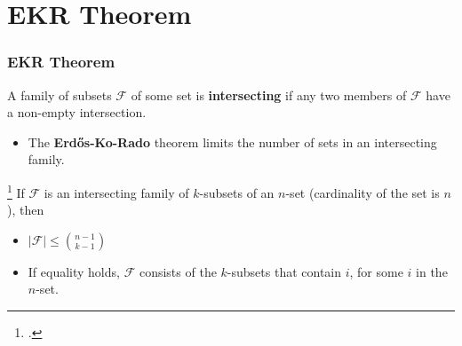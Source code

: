 \documentclass[10pt,]{beamer}
\theoremstyle{conjectureStyle}
\theoremstyle{notationStyle}
\begin{document}
\section{EKR Theorem}
\begin{frame}\frametitle{EKR Theorem}
    \begin{definition}
        A family of subsets $\mathcal{F}$ of some set is \textbf{intersecting} if any two members of $\mathcal{F}$ have a non-empty intersection.
    \end{definition}
    \begin{itemize}
        \item The \textbf{Erd\H{o}s-Ko-Rado} theorem limits the number of sets in an intersecting family.
    \end{itemize}
    \begin{theorem}
        \footcite{Erds1961INTERSECTIONTF} If $\mathcal{F}$ is an intersecting family of $k$-subsets of an $n$-set (cardinality of the set is $n$), then
        \begin{itemize}
            \item $|\mathcal{F}| \leq \binom{n - 1}{k - 1}$
            \item If equality holds, $\mathcal{F}$ consists of the $k$-subsets that contain $i$, for some $i$ in the $n$-set.
        \end{itemize}
    \end{theorem}
\end{frame}
\end{document}

